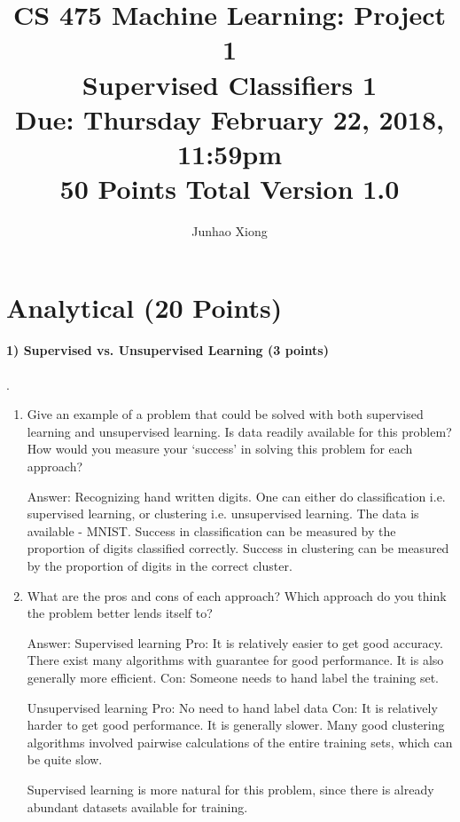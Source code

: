 \documentclass[11pt]{article}
\title{CS 475 Machine Learning: Project 1\\Supervised Classifiers 1\\
	\Large{Due: Thursday February 22, 2018, 11:59pm}\\
	50 Points Total \hspace{1cm} Version 1.0}
\author{Junhao Xiong}
\date{}
\begin{document}
	\large
	\maketitle
	\thispagestyle{headings}
	
	\vspace{-.5in}
	
	
		\section{Analytical (20 Points)}
	
	\paragraph{1) Supervised vs. Unsupervised Learning (3 points)}.
	\begin{enumerate}
		\item Give an example of a problem that could be solved with both supervised learning and unsupervised learning. Is data readily available for this problem? How would you measure your `success' in solving this problem for each approach?\newline
		
		Answer: Recognizing hand written digits. One can either do classification i.e. supervised learning, or clustering i.e. unsupervised learning. The data is available - MNIST. Success in classification can be measured by the proportion of digits classified correctly. Success in clustering can be measured by the proportion of digits in the correct cluster.  
		
		\item What are the pros and cons of each approach? Which approach do you think the problem better lends itself to?\newline
		
		Answer:\newline
		Supervised learning\newline
		Pro: It is relatively easier to get good accuracy. There exist many algorithms with guarantee for good performance. It is also generally more efficient.\newline
		Con: Someone needs to hand label the training set.\newline                                                                                                           
		
		Unsupervised learning\newline                                                        
		Pro: No need to hand label data\newline
		Con: It is relatively harder to get good performance. It is generally slower. Many good clustering algorithms involved pairwise calculations of the entire training sets, which can be quite slow.\newline
		
		Supervised learning is more natural for this problem, since there is already abundant datasets available for training.
		
	\end{enumerate}
	
\end{document}
